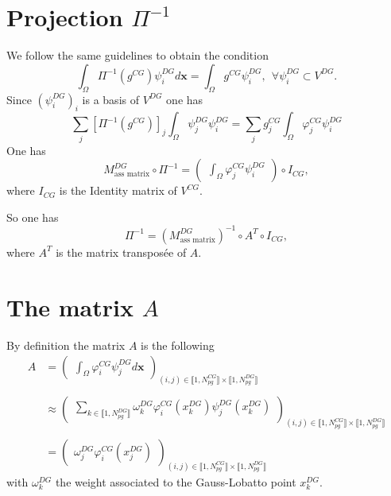 \documentclass[a4paper, 11pt]{report}
\begin{document}
\section{Projection $\Pi^{-1}$}
We follow the same guidelines to obtain the condition
\begin{equation*}
\int_{\Omega}\Pi^{-1}(g^{CG})\psi_i^{DG}d\boldsymbol{x}=\int_{\Omega}g^{CG}\psi_i^{DG},\ \ \forall \psi_i^{DG}\subset V^{DG}.
\end{equation*}
Since $(\psi_i^{DG})_i$ is a basis of $V^{DG}$ one has
\begin{equation*}
\sum_{j}\left[\Pi^{-1}(g^{CG})\right]_j\int_{\Omega}\psi_j^{DG}\psi_i^{DG}=\sum_{j}g^{CG}_j\int_{\Omega}\varphi_j^{CG}\psi_i^{DG}
\end{equation*}
One has
\begin{equation*}
M_{\text{ass matrix}}^{DG}\circ \Pi^{-1}=\begin{pmatrix}\int_{\Omega}\varphi_j^{CG}\psi_i^{DG}\end{pmatrix}\circ I_{CG},
\end{equation*}
where $I_{CG}$ is the Identity matrix of $V^{CG}$.

So one has
\begin{equation*}
\Pi^{-1}=\left(M^{DG}_{\text{ass matrix}}\right)^{-1}\circ A^{T}\circ I_{CG},
\end{equation*}
where $A^{T}$ is the matrix transpos\'ee of $A$.

\section{The matrix $A$}
By definition the matrix $A$ is the following
\begin{equation*}
\begin{split}
A&=\begin{pmatrix}\int_{\Omega}\varphi_i^{CG}\psi_j^{DG}d\boldsymbol{x}\end{pmatrix}_{(i,j)\in \llbracket 1, N_{pg}^{CG}\rrbracket \times\llbracket 1, N_{pg}^{DG}\rrbracket}\\
&\\
&\approx \begin{pmatrix}\displaystyle\sum_{k\in\llbracket 1, N_{pg}^{DG}\rrbracket}\omega^{DG}_k\varphi_i^{CG}(x_k^{DG})\psi_j^{DG}(x_k^{DG})\end{pmatrix}_{(i,j)\in \llbracket 1, N_{pg}^{CG}\rrbracket \times\llbracket 1, N_{pg}^{DG}\rrbracket}\\
&\\
&=\begin{pmatrix}\omega_j^{DG}\varphi_i^{CG}(x_j^{DG})\end{pmatrix}_{(i,j)\in \llbracket 1, N_{pg}^{CG}\rrbracket \times\llbracket 1, N_{pg}^{DG}\rrbracket}
\end{split}
\end{equation*}
with $\omega_k^{DG}$ the weight associated to the Gauss-Lobatto point $x_k^{DG}$.\\
\end{document}
